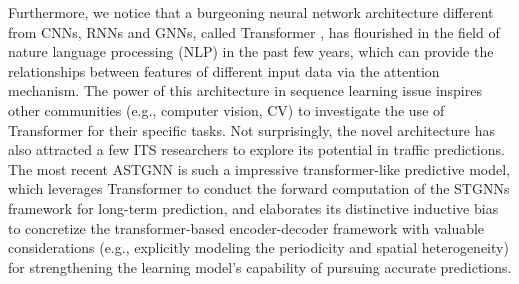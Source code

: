 Furthermore, we notice that a burgeoning neural network architecture different from CNNs, RNNs and GNNs, called Transformer \cite{vaswani2017attention}, has flourished in the field of nature language processing (NLP) in the past few years, which can provide the relationships between features of different input data via the attention mechanism. The power of this architecture in sequence learning issue inspires other communities (e.g., computer vision, CV) to investigate the use of Transformer for their specific tasks. Not surprisingly, the novel architecture has also attracted a few ITS researchers to explore its potential in traffic predictions. The most recent ASTGNN \cite{2021Learning} is such a impressive transformer-like predictive model, which leverages Transformer to conduct the forward computation of the STGNNs framework for long-term prediction, and elaborates its distinctive inductive bias to concretize the transformer-based encoder-decoder framework with valuable considerations (e.g., explicitly modeling the periodicity and spatial heterogeneity) for strengthening the learning model’s capability of pursuing accurate predictions. 

